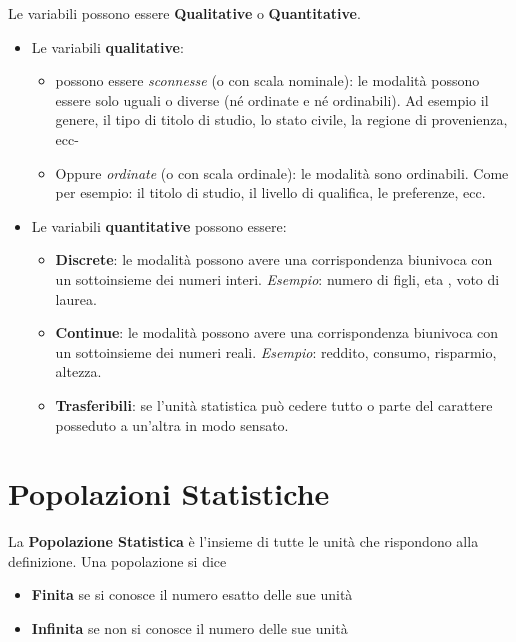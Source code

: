 \documentclass[
  11pt,
]{book}
\providecommand{\tightlist}{%
  \setlength{\itemsep}{0pt}\setlength{\parskip}{0pt}}
\theoremstyle{mytheoremstyle}
\theoremstyle{mydefstyle}
\begin{document}
Le variabili possono essere \textbf{Qualitative} o \textbf{Quantitative}.

\begin{itemize}
\tightlist
\item
  Le variabili \textbf{qualitative}:

  \begin{itemize}
  \tightlist
  \item
    possono essere \emph{sconnesse} (o con scala nominale): le modalità possono essere solo uguali o diverse (né ordinate e né ordinabili). Ad esempio il genere, il tipo di titolo di studio, lo stato civile, la regione di provenienza, ecc-
  \item
    Oppure \emph{ordinate} (o con scala ordinale): le modalità sono ordinabili. Come per esempio: il titolo di studio, il livello di qualifica, le preferenze, ecc.
  \end{itemize}
\item
  Le variabili \textbf{quantitative} possono essere:

  \begin{itemize}
  \tightlist
  \item
    \textbf{Discrete}: le modalità possono avere una corrispondenza biunivoca con un sottoinsieme dei numeri interi.
    \emph{Esempio}: numero di figli, eta , voto di laurea.
  \item
    \textbf{Continue}: le modalità possono avere una corrispondenza biunivoca con un sottoinsieme dei numeri reali.
    \emph{Esempio}: reddito, consumo, risparmio, altezza.
  \item
    \textbf{Trasferibili}: se l'unità statistica può cedere tutto o parte del carattere posseduto a un'altra in modo sensato.
  \end{itemize}
\end{itemize}

\section{Popolazioni Statistiche}\label{popolazioni-statistiche}

La \textbf{Popolazione Statistica} è l'insieme di tutte le unità che rispondono alla definizione.
Una popolazione si dice

\begin{itemize}
\tightlist
\item
  \textbf{Finita} se si conosce il numero esatto delle sue unità
\item
  \textbf{Infinita} se non si conosce il numero delle sue unità
\end{itemize}
\end{document}
